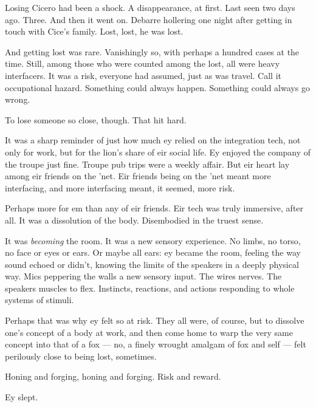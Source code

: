 Losing Cicero had been a shock. A disappearance, at first. Last seen two days ago. Three. And then it went on. Debarre hollering one night after getting in touch with Cice's family. Lost, lost, he was lost.

And getting lost was rare. Vanishingly so, with perhaps a hundred cases at the time. Still, among those who were counted among the lost, all were heavy interfacers. It was a risk, everyone had assumed, just as was travel. Call it occupational hazard. Something could always happen. Something could always go wrong.

To lose someone so close, though. That hit hard.

It was a sharp reminder of just how much ey relied on the integration tech, not only for work, but for the lion's share of eir social life. Ey enjoyed the company of the troupe just fine. Troupe pub trips were a weekly affair. But eir heart lay among eir friends on the 'net. Eir friends being on the 'net meant more interfacing, and more interfacing meant, it seemed, more risk.

Perhaps more for em than any of eir friends. Eir tech was truly immersive, after all. It was a dissolution of the body. Disembodied in the truest sense.

It was \emph{becoming} the room. It was a new sensory experience. No limbs, no torso, no face or eyes or ears. Or maybe all ears: ey became the room, feeling the way sound echoed or didn't, knowing the limits of the speakers in a deeply physical way. Mics peppering the walls a new sensory input. The wires nerves. The speakers muscles to flex. Instincts, reactions, and actions responding to whole systems of stimuli.

Perhaps that was why ey felt so at risk. They all were, of course, but to dissolve one's concept of a body at work, and then come home to warp the very same concept into that of a fox — no, a finely wrought amalgam of fox and self — felt perilously close to being lost, sometimes.

Honing and forging, honing and forging. Risk and reward.

Ey slept.
